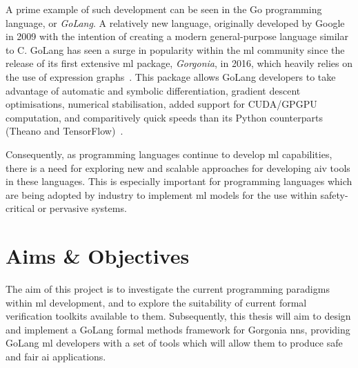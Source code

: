 A prime example of such development can be seen in the Go programming language, or \textit{GoLang}. A relatively new language, originally developed by Google in 2009 with the intention
of creating a modern general-purpose language similar to C. 
GoLang has seen a surge in popularity within the \gls{ml} community since
the release of its first extensive \gls{ml} package, \textit{Gorgonia}, in 2016, which heavily relies on the use of expression graphs~\citep{chew2016}.
This package allows GoLang developers
to take advantage of automatic and symbolic differentiation, gradient descent optimisations, numerical stabilisation,
added support for CUDA/GPGPU computation, and comparitively quick speeds than its Python counterparts (Theano and TensorFlow)~\citep{golang2020}.


Consequently, as programming languages continue to develop \gls{ml} capabilities, there is a need for 
exploring new and scalable approaches for developing \gls{aiv} tools in these languages.
This is especially important for programming languages which are being adopted by industry to implement \gls{ml} models
for the use within safety-critical or pervasive systems.

\section{Aims \& Objectives}






The aim of this project is to investigate the current programming paradigms within \gls{ml} development,
and to explore the suitability of current formal verification toolkits available to them. Subsequently,
this thesis will aim to design and implement a GoLang formal methods framework for Gorgonia \glspl{nn},
providing GoLang \gls{ml} developers with a set of tools which will allow them to produce safe and
fair \gls{ai} applications.

